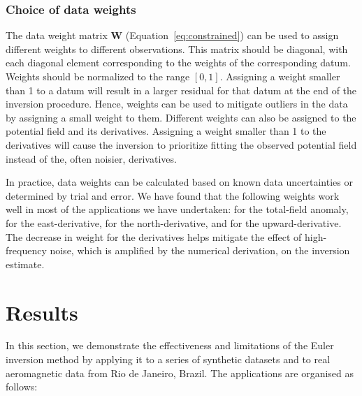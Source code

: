 \subsubsection{Choice of data weights}

The data weight matrix $\mathbf{W}$ (Equation~\ref{eq:constrained}) can be used
to assign different weights to different observations.
This matrix should be diagonal, with each diagonal element corresponding to the
weights of the corresponding datum.
Weights should be normalized to the range $[0, 1]$.
Assigning a weight smaller than 1 to a datum will result in a larger residual
for that datum at the end of the inversion procedure.
Hence, weights can be used to mitigate outliers in the data by assigning
a small weight to them.
Different weights can also be assigned to the potential field and its
derivatives.
Assigning a weight smaller than 1 to the derivatives will cause the inversion
to prioritize fitting the observed potential field instead of the, often
noisier, derivatives.

In practice, data weights can be calculated based on known data uncertainties
or determined by trial and error.
We have found that the following weights work well in most of the applications
we have undertaken: \DefaultWeightsF{} for the total-field anomaly,
\DefaultWeightsE{} for the east-derivative, \DefaultWeightsN{} for the
north-derivative, and \DefaultWeightsU{} for the upward-derivative.
The decrease in weight for the derivatives helps mitigate the effect of
high-frequency noise, which is amplified by the numerical derivation, on the
inversion estimate.

\section{Results}

In this section, we demonstrate the effectiveness and limitations of the Euler
inversion method by applying it to a series of synthetic datasets and to real
aeromagnetic data from Rio de Janeiro, Brazil.
The applications are organised as follows:

